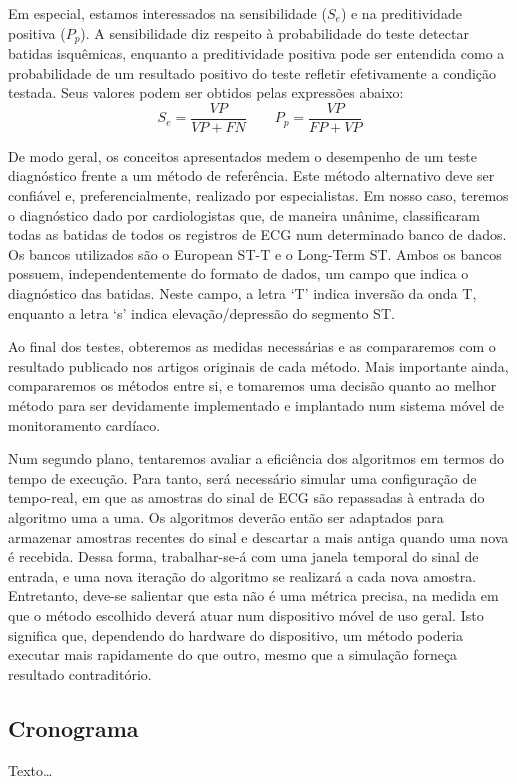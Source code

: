 Em especial, estamos interessados na sensibilidade ($S_e$) e na preditividade positiva ($P_p$). A sensibilidade diz respeito à probabilidade do teste detectar batidas isquêmicas, enquanto a preditividade positiva pode ser entendida como a probabilidade de um resultado positivo do teste refletir efetivamente a condição testada. Seus valores podem ser obtidos pelas expressões abaixo:
\begin{equation} \label{equ:metrics}
    S_e = \frac{VP}{VP+FN}
    \quad\quad
    P_p = \frac{VP}{FP+VP}
\end{equation}

De modo geral, os conceitos apresentados medem o desempenho de um teste diagnóstico frente a um método de referência. Este método alternativo deve ser confiável e, preferencialmente, realizado por especialistas. Em nosso caso, teremos o diagnóstico dado por cardiologistas que, de maneira unânime, classificaram todas as batidas de todos os registros de ECG num determinado banco de dados. Os bancos utilizados são o European ST-T e o Long-Term ST. Ambos os bancos possuem, independentemente do formato de dados, um campo que indica o diagnóstico das batidas. Neste campo, a letra `T' indica inversão da onda T, enquanto a letra `s' indica elevação/depressão do segmento ST.

Ao final dos testes, obteremos as medidas necessárias e as compararemos com o resultado publicado nos artigos originais de cada método. Mais importante ainda, compararemos os métodos entre si, e tomaremos uma decisão quanto ao melhor método para ser devidamente implementado e implantado num sistema móvel de monitoramento cardíaco.

Num segundo plano, tentaremos avaliar a eficiência dos algoritmos em termos do tempo de execução. Para tanto, será necessário simular uma configuração de tempo-real, em que as amostras do sinal de ECG são repassadas à entrada do algoritmo uma a uma. Os algoritmos deverão então ser adaptados para armazenar amostras recentes do sinal e descartar a mais antiga quando uma nova é recebida. Dessa forma, trabalhar-se-á com uma janela temporal do sinal de entrada, e uma nova iteração do algoritmo se realizará a cada nova amostra. Entretanto, deve-se salientar que esta não é uma métrica precisa, na medida em que o método escolhido deverá atuar num dispositivo móvel de uso geral. Isto significa que, dependendo  do hardware do dispositivo, um método poderia executar mais rapidamente do que outro, mesmo que a simulação forneça resultado contraditório.


\subsection{Cronograma}
Texto\ldots
